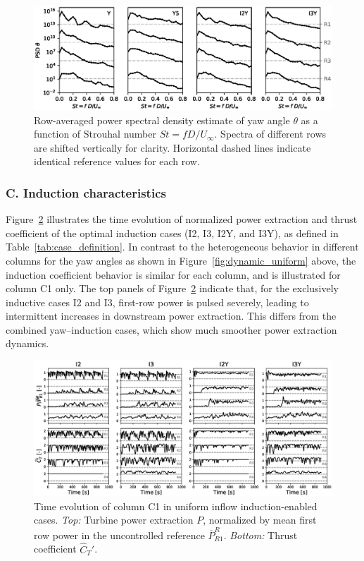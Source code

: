 	\begin{figure}
		\includegraphics[width=\textwidth]{chapters/optimal_yaw_control/PSD_laminar.eps}
		\caption[Row-averaged power spectral density estimate of yaw angle $\theta$ as a function of Strouhal number $St = f D/U_\infty$.]{Row-averaged power spectral density estimate of yaw angle $\theta$ as a function of Strouhal number $St = f D/U_\infty$. Spectra of different rows are shifted vertically for clarity. Horizontal dashed lines indicate identical reference values for each row.\label{fig:spec_uniform}}
	\end{figure}
	
	
	\subsubsection{C. Induction characteristics}
	Figure~\ref{fig:dynamic_ctfilt} illustrates the time evolution of normalized power extraction and thrust coefficient of the optimal induction cases (I2, I3, I2Y, and I3Y), as defined in Table~\ref{tab:case_definition}. In contrast to the heterogeneous behavior in different columns for the yaw angles as shown in Figure~\ref{fig:dynamic_uniform} above, the induction coefficient behavior is similar for each column, and is illustrated for column C1 only. The top panels of Figure~\ref{fig:dynamic_ctfilt} indicate that, for the exclusively inductive cases I2 and I3, first-row power is pulsed severely, leading to intermittent increases in downstream power extraction. This differs from the combined yaw--induction cases, which show much smoother power extraction dynamics. 
	\begin{figure}
		\includegraphics[width=\textwidth]{chapters/optimal_yaw_control/power_ctfilt_lam_bw.eps}	
		\caption[Time evolution of column C1 in uniform inflow induction-enabled cases.]{Time evolution of column C1 in uniform inflow induction-enabled cases. \emph{Top: } Turbine power extraction $P$, normalized by mean first row power in the uncontrolled reference $\overline{P}_{R1}^R$. \emph{Bottom: } Thrust coefficient $\widehat{C}_T'$. \label{fig:dynamic_ctfilt}}
	\end{figure}
	
